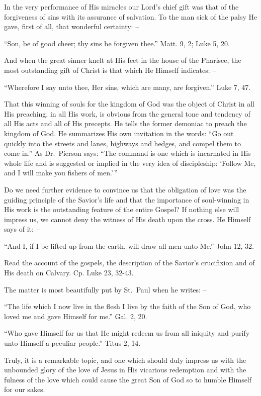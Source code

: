 \documentclass[
]{book}
\begin{document}
In the very performance of His miracles our Lord's chief gift was that of the forgiveness of sins with its assurance of salvation. To the man sick of the palsy He gave, first of all, that wonderful certainty: --

``Son, be of good cheer; thy sins be forgiven thee.'' Matt. 9, 2; Luke 5, 20.

And when the great sinner knelt at His feet in the house of the Pharisee, the most outstanding gift of Christ is that which He Himself indicates: --

``Wherefore I say unto thee, Her sins, which are many, are forgiven.'' Luke 7, 47.

That this winning of souls for the kingdom of God was the object of Christ in all His preaching, in all His work, is obvious from the general tone and tendency of all His acts and all of His precepts. He tells the former demoniac to preach the kingdom of God. He summarizes His own invitation in the words: ``Go out quickly into the streets and lanes, highways and hedges, and compel them to come in.'' As Dr.~Pierson says: ``The command is one which is incarnated in His whole life and is suggested or implied in the very idea of discipleship: `Follow Me, and I will make you fishers of men.'\,''

Do we need further evidence to convince us that the obligation of love was the guiding principle of the Savior's life and that the importance of soul-winning in His work is the outstanding feature of the entire Gospel? If nothing else will impress us, we cannot deny the witness of His death upon the cross. He Himself says of it: --

``And I, if I be lifted up from the earth, will draw all men unto Me.'' John 12, 32.

Read the account of the gospels, the description of the Savior's crucifixion and of His death on Calvary. Cp. Luke 23, 32-43.

The matter is most beautifully put by St.~Paul when he writes: --

``The life which I now live in the flesh I live by the faith of the Son of God, who loved me and gave Himself for me.'' Gal. 2, 20.

``Who gave Himself for us that He might redeem us from all iniquity and purify unto Himself a peculiar people.'' Titus 2, 14.

Truly, it is a remarkable topic, and one which should duly impress us with the unbounded glory of the love of Jesus in His vicarious redemption and with the fulness of the love which could cause the great Son of God so to humble Himself for our sakes.
\end{document}

